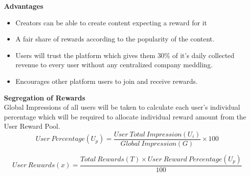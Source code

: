 \documentclass[10pt]{article}
\begin{document}
\textbf{Advantages}
\begin{itemize}[leftmargin=+0.2in]
\item Creators can be able to create content expecting a reward for it
\item A fair share of rewards according to the popularity of the content.
\item Users will trust the platform which gives them 30\% of it’s daily collected revenue to every user without any centralized company meddling.
\item Encourages other platform users to join and receive rewards.
\end{itemize}


\textbf{Segregation of Rewards}\\

Global Impressions of all users will be taken to calculate each user’s individual percentage which will be required to allocate individual reward amount from the User Reward Pool.\\

\begin{equation}
User\:Percentage(U_p)=\frac{User\:Total\:Impression(U_i)}{Global\:Impression(G)} \times 100
\end{equation}

\begin{equation}
User\:Rewards(x)=\frac{Total\:Rewards(T) \times User\:Reward\:Percentage(U_p)}{100}
\end{equation}\\
\end{document}
